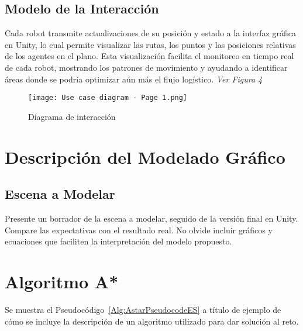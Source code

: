 \documentclass[sjournal]{IEEEtran}
\begin{document}
\subsection{Modelo de la Interacción}
Cada robot transmite actualizaciones de su posición y estado a la interfaz gráfica en Unity, lo cual permite visualizar las rutas, los puntos y las posiciones relativas de los agentes en el plano. Esta visualización facilita el monitoreo en tiempo real de cada robot, mostrando los patrones de movimiento y ayudando a identificar áreas donde se podría optimizar aún más el flujo logístico. \textit{Ver Figura 4}
\begin{figure}[h!]
    \centering
    \texttt{[image: Use case diagram - Page 1.png]}
    \caption{Diagrama de interacción}
    \label{fig:etiqueta}
\end{figure}

\section{Descripción del Modelado Gráfico}
\subsection{Escena a Modelar}
Presente un borrador de la escena a modelar, seguido de la versión final en Unity. Compare las expectativas con el resultado real. No olvide incluir gráficos y ecuaciones que faciliten la interpretación del modelo propuesto.

\section{Algoritmo A*}

Se muestra el Pseudocódigo~\ref{Alg:AstarPseudocodeES} a título de ejemplo de cómo se incluye la descripción de un algoritmo utilizado para dar solución al reto.
\end{document}
